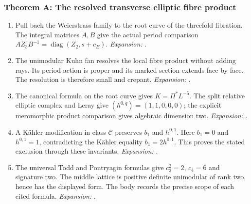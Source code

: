 \subsubsection*{Theorem A: The resolved transverse elliptic fibre product}
\begin{enumerate}[label=\arabic*.,leftmargin=*]
\item\hypertarget{step-V-A-1}{} Pull back the Weierstrass family to the root curve of the
threefold fibration.  The integral matrices $A,B$ give the actual
period comparison $AZ_3B^{-1}=\operatorname{diag}(Z_2,s+c_E)$.
\textit{Expansion:} .
\item\hypertarget{step-V-A-2}{} The unimodular Kuhn fan resolves the local fibre product
without adding rays.  Its period action is proper and its marked
section extends face by face.  The resolution is therefore small
and crepant.
\textit{Expansion:} .
\item\hypertarget{step-V-A-3}{} The canonical formula on the root curve gives
$K=\Pi^*L^{-5}$.  The split relative elliptic complex and Leray
give $(h^{0,q})=(1,1,0,0,0)$; the explicit meromorphic product
comparison gives algebraic dimension two.
\textit{Expansion:} .
\item\hypertarget{step-V-A-4}{} A K\"ahler modification in class $\mathcal C$ preserves
$b_1$ and $h^{0,1}$.  Here $b_1=0$ and $h^{0,1}=1$, contradicting
the K\"ahler equality $b_1=2h^{0,1}$.  This proves the stated
exclusion through these invariants.
\textit{Expansion:} .
\item\hypertarget{step-V-A-5}{} The universal Todd and Pontryagin formulas give
$c_2^2=2$, $c_4=6$ and signature two.  The middle lattice is
positive definite unimodular of rank two, hence has the displayed
form.  The body records the precise scope of each cited formula.
\textit{Expansion:} .
\end{enumerate}

\hypertarget{outline-V-B}{}
